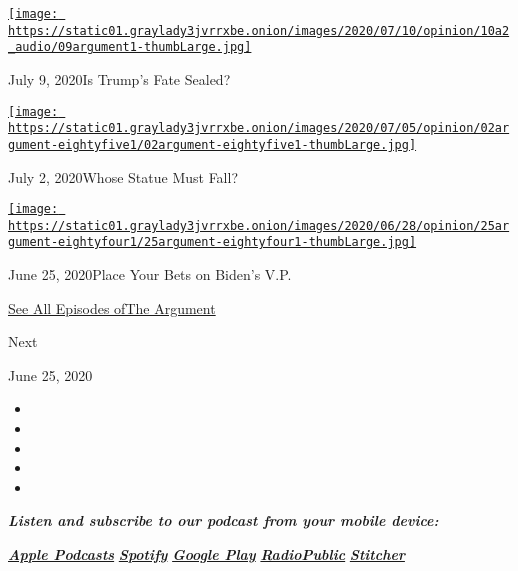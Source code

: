 \href{https://www.nytimes3xbfgragh.onion/2020/07/09/opinion/is-trumps-fate-sealed.html?action=click\&module=audio-series-bar\&region=header\&pgtype=Article}{\texttt{[image: https://static01.graylady3jvrrxbe.onion/images/2020/07/10/opinion/10a2\_audio/09argument1-thumbLarge.jpg]}}

July 9, 2020Is Trump's Fate Sealed?

\href{https://www.nytimes3xbfgragh.onion/2020/07/02/opinion/the-argument-protest-statue-revolution.html?action=click\&module=audio-series-bar\&region=header\&pgtype=Article}{\texttt{[image: https://static01.graylady3jvrrxbe.onion/images/2020/07/05/opinion/02argument-eightyfive1/02argument-eightyfive1-thumbLarge.jpg]}}

July 2, 2020Whose Statue Must Fall?

\href{https://www.nytimes3xbfgragh.onion/2020/06/25/opinion/the-argument-biden-vice-president-supreme-court.html?action=click\&module=audio-series-bar\&region=header\&pgtype=Article}{\texttt{[image: https://static01.graylady3jvrrxbe.onion/images/2020/06/28/opinion/25argument-eightyfour1/25argument-eightyfour1-thumbLarge.jpg]}}

June 25, 2020Place Your Bets on Biden's V.P.

\href{https://www.nytimes3xbfgragh.onion/column/the-argument}{See All
Episodes ofThe Argument}

Next

June 25, 2020

\begin{itemize}
\item
\item
\item
\item
\item
\end{itemize}

\emph{\textbf{Listen and subscribe to our podcast from your mobile
device:}}

\textbf{\href{https://itunes.apple.com/us/podcast/the-argument/id1438024613?mt=2}{\emph{Apple
Podcasts}}} \emph{\textbf{\textbar{}}}
\textbf{\href{https://open.spotify.com/show/6bmhSFLKtApYClEuSH8q42}{\emph{Spotify}}}
\emph{\textbf{\textbar{}}}
\textbf{\href{https://play.google.com/music/m/Idxib4hsg3yviao4gtym76knjjy?t=The_Argument}{\emph{Google
Play}}} \emph{\textbf{\textbar{}}}
\textbf{\href{https://radiopublic.com/the-argument-Wdbepr}{\emph{RadioPublic}}}
\emph{\textbf{\textbar{}}}
\textbf{\href{https://www.stitcher.com/podcast/the-new-york-times/the-argument}{\emph{Stitcher}}}


